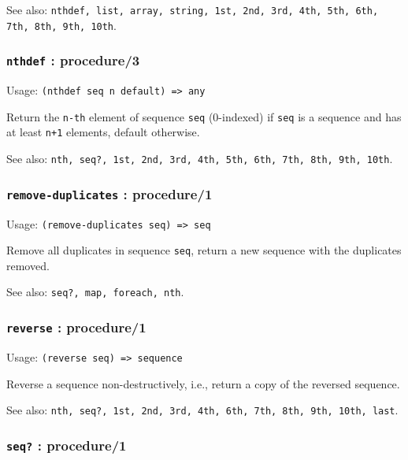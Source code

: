 \documentclass[
]{article}
\newcommand{\passthrough}[1]{#1}
\begin{document}
See also:
\passthrough{\lstinline!nthdef, list, array, string, 1st, 2nd, 3rd, 4th, 5th, 6th, 7th, 8th, 9th, 10th!}.

\hypertarget{nthdef-procedure3}{%
\subsubsection{\texorpdfstring{\texttt{nthdef} :
procedure/3}{nthdef : procedure/3}}\label{nthdef-procedure3}}

Usage: \passthrough{\lstinline!(nthdef seq n default) => any!}

Return the \passthrough{\lstinline!n-th!} element of sequence
\passthrough{\lstinline!seq!} (0-indexed) if
\passthrough{\lstinline!seq!} is a sequence and has at least
\passthrough{\lstinline!n+1!} elements, default otherwise.

See also:
\passthrough{\lstinline!nth, seq?, 1st, 2nd, 3rd, 4th, 5th, 6th, 7th, 8th, 9th, 10th!}.

\hypertarget{remove-duplicates-procedure1}{%
\subsubsection{\texorpdfstring{\texttt{remove-duplicates} :
procedure/1}{remove-duplicates : procedure/1}}\label{remove-duplicates-procedure1}}

Usage: \passthrough{\lstinline!(remove-duplicates seq) => seq!}

Remove all duplicates in sequence \passthrough{\lstinline!seq!}, return
a new sequence with the duplicates removed.

See also: \passthrough{\lstinline!seq?, map, foreach, nth!}.

\hypertarget{reverse-procedure1}{%
\subsubsection{\texorpdfstring{\texttt{reverse} :
procedure/1}{reverse : procedure/1}}\label{reverse-procedure1}}

Usage: \passthrough{\lstinline!(reverse seq) => sequence!}

Reverse a sequence non-destructively, i.e., return a copy of the
reversed sequence.

See also:
\passthrough{\lstinline!nth, seq?, 1st, 2nd, 3rd, 4th, 6th, 7th, 8th, 9th, 10th, last!}.

\hypertarget{seq-procedure1}{%
\subsubsection{\texorpdfstring{\texttt{seq?} :
procedure/1}{seq? : procedure/1}}\label{seq-procedure1}}
\end{document}
